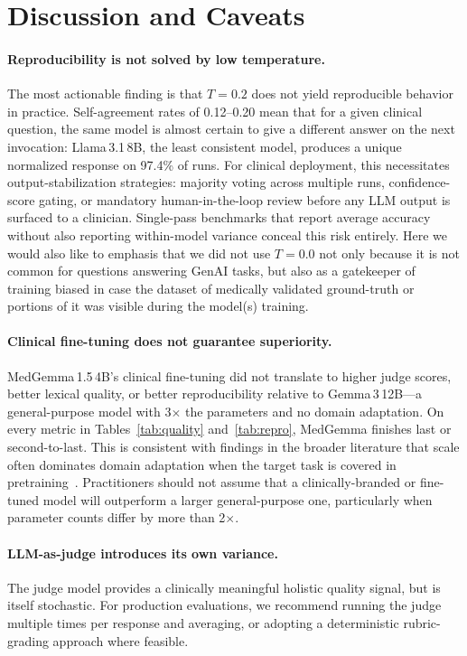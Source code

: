 \documentclass[11pt,twocolumn]{article}
\begin{document}
\section{Discussion and Caveats}

\paragraph{Reproducibility is not solved by low temperature.}
The most actionable finding is that $T{=}0.2$ does not yield
reproducible behavior in practice.
Self-agreement rates of 0.12--0.20 mean that for a given clinical
question, the same model is almost certain to give a different answer
on the next invocation: Llama\,3.1\,8B, the least consistent model,
produces a unique normalized response on 97.4\% of runs.
For clinical deployment, this necessitates output-stabilization
strategies: majority voting across multiple runs, confidence-score
gating, or mandatory human-in-the-loop review before any LLM output
is surfaced to a clinician.
Single-pass benchmarks that report average accuracy without also
reporting within-model variance conceal this risk entirely. Here 
we would also like to emphasis that we did not use $T{=}0.0$ not 
only because it is not common for questions answering GenAI tasks, 
but also as a gatekeeper of training biased in case the dataset 
of medically validated ground-truth or portions of it was visible
during the model(s) training. 

\paragraph{Clinical fine-tuning does not guarantee superiority.}
MedGemma\,1.5\,4B's clinical fine-tuning did not translate to higher
judge scores, better lexical quality, or better reproducibility
relative to Gemma\,3\,12B---a general-purpose model with 3$\times$
the parameters and no domain adaptation.
On every metric in Tables~\ref{tab:quality} and~\ref{tab:repro},
MedGemma finishes last or second-to-last.
This is consistent with findings in the broader literature that
scale often dominates domain adaptation when the target task is
covered in pretraining~\cite{singhal2023large}.
Practitioners should not assume that a clinically-branded or
fine-tuned model will outperform a larger general-purpose one,
particularly when parameter counts differ by more than 2$\times$.

\paragraph{LLM-as-judge introduces its own variance.}
The judge model provides a clinically meaningful holistic quality
signal, but is itself stochastic.
For production evaluations, we recommend running the judge multiple
times per response and averaging, or adopting a deterministic
rubric-grading approach where feasible.
\end{document}
